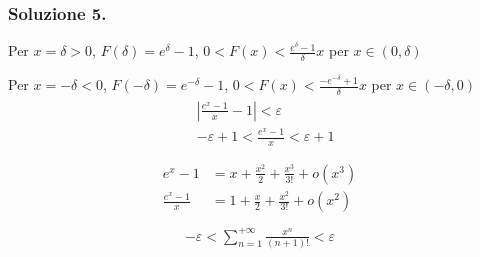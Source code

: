 \documentclass[letterpaper,10pt,italian]{jupyterBook}
\begin{document}
\subsubsection*{Soluzione 5.}

\sphinxAtStartPar
{}

\sphinxAtStartPar
Per \(x = \delta > 0\), \(F(\delta) = e^{\delta} - 1\), \(0 < F(x) < \frac{e^{\delta}-1}{\delta} x\) per \(x \in (0,\delta)\)

\sphinxAtStartPar
Per \(x = -\delta < 0\), \(F(-\delta) = e^{-\delta} - 1\), \(0 < F(x) < \frac{-e^{-\delta}+1}{\delta} x\) per \(x \in (-\delta, 0)\)
\begin{equation*}
\begin{split}\begin{aligned}
  & \left| \frac{e^x-1}{x} - 1 \right| < \varepsilon \\
  & -\varepsilon + 1 < \frac{e^x-1}{x} < \varepsilon + 1 \\
\end{aligned}\end{split}
\end{equation*}\begin{equation*}
\begin{split}\begin{aligned}
  e^{x} - 1 & = x + \frac{x^2}{2} + \frac{x^3}{3!} + o(x^3) \\
  \frac{e^{x} - 1}{x} & = 1 + \frac{x}{2} + \frac{x^2}{3!} + o(x^2) \\
\end{aligned}\end{split}
\end{equation*}\begin{equation*}
\begin{split}-\varepsilon < \sum_{n=1}^{+\infty} \frac{x^n}{(n+1)!} < \varepsilon\end{split}
\end{equation*}

 \label{exercise:ch/infinitesimal_calculus/analysis-problems-exercise-1}
\end{document}
